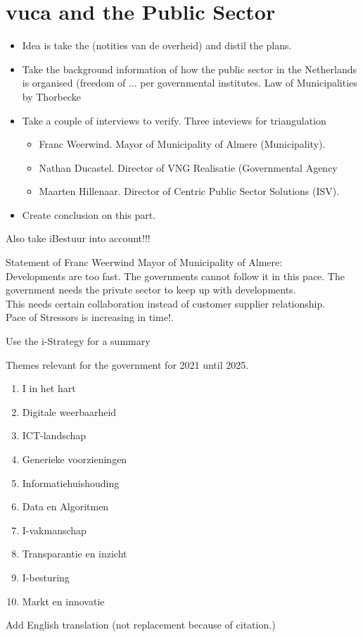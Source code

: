 \chapter{\acrshort{vuca} and the Public Sector}

\begin{itemize}
\item{Idea is take the (notities van de overheid) and distil the plans.}
\item{Take the background information of how the public sector in the Netherlands is organised (freedom of ... per governmental institutes. Law of Municipalities by Thorbecke }
\item{Take a couple of interviews to verify. Three inteviews for triangulation}
\begin{itemize}
	\item{Franc Weerwind. Mayor of Municipality of Almere (Municipality).}
	\item{Nathan Ducastel. Director of VNG Realisatie (Governmental Agency}
	\item{Maarten Hillenaar. Director of Centric Public Sector Solutions (ISV).}
\end{itemize}
\item{Create conclusion on this part.}
\end{itemize}

\begin{remark}
	Also take iBestuur into account!!!
\end{remark}

Statement of Franc Weerwind Mayor of Municipality of Almere:\\
Developments are too fast. The governments cannot follow it in this pace. The government needs the private sector to keep up with developments.\\
This needs certain collaboration instead of customer supplier relationship.\\
Pace of Stressors is increasing in time!.\\

\begin{remark}
	Use the i-Strategy for a summary \parencite{Digitaleoverheid}
\end{remark}

Themes relevant for the government for 2021 until 2025.

\begin{enumerate}
	\item{I in het hart}
	\item{Digitale weerbaarheid}
	\item{ICT-landschap}
	\item{Generieke voorzieningen}
	\item{Informatiehuishouding}
	\item{Data en Algoritmen}
	\item{I-vakmanschap}
	\item{Transparantie en inzicht}
	\item{I-besturing}
	\item{Markt en innovatie}
\end{enumerate}

\begin{remark}
	Add English translation (not replacement because of citation.)
\end{remark}